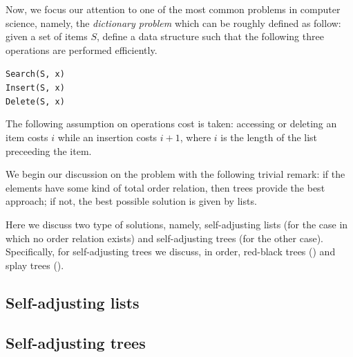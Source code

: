 \documentclass{subfiles}
\begin{document}
    Now, we focus our attention to one of the most common problems in computer science,
        namely, the \emph{dictionary problem} which can be roughly defined as follow:
        given a set of items \(S\), define a data structure such that the following 
        three operations are performed efficiently.
        \begin{center}
            \lstinline{Search(S, x)} \\ 
            \lstinline{Insert(S, x)} \\ 
            \lstinline{Delete(S, x)}
        \end{center}
    The following assumption on operations cost is taken: accessing or deleting an item costs 
        \(i\) while an insertion costs \(i + 1\),
        where \(i\) is the length of the list preceeding the item.

    We begin our discussion on the problem with the following trivial remark: 
        if the elements have some kind of total order relation, then trees provide the best approach;
        if not, the best possible solution is given by lists.

    Here we discuss two type of solutions, namely,
        self-adjusting lists (for the case in which no order relation exists) and self-adjusting trees
        (for the other case). Specifically, for self-adjusting trees we discuss, in order,
        red-black trees () and splay trees ().

    \subsection{Self-adjusting lists}
    
    
    \subsection{Self-adjusting trees}
    
\end{document}

